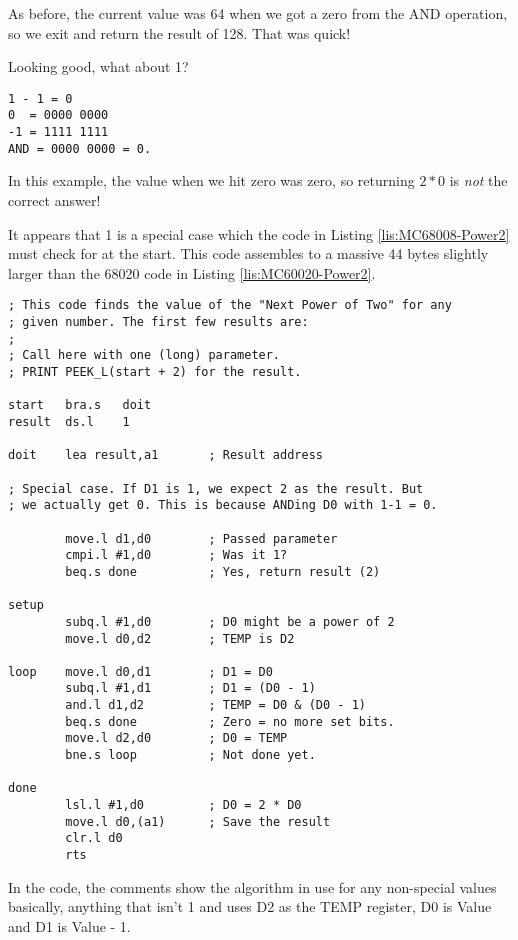 As before, the current value was 64 when we got a zero from the AND
operation, so we exit and return the result of 128. That was quick!

Looking good, what about 1?

\begin{lstlisting}[showstringspaces=false,tabsize=4,numbers=none]
1 - 1 = 0
0  = 0000 0000
-1 = 1111 1111
AND = 0000 0000 = 0.
\end{lstlisting}

In this example, the value when we hit zero was zero, so returning
$2*0$ is \emph{not} the correct answer!

It appears that 1 is a special case which the code in Listing \ref{lis:MC68008-Power2}
must check for at the start. This code assembles to a massive 44 bytes
\textendash{} slightly larger than the 68020 code in Listing \ref{lis:MC60020-Power2}.

\begin{lstlisting}[caption={MC68008 - Power2\_asm},label={lis:MC68008-Power2}]
; This code finds the value of the "Next Power of Two" for any
; given number. The first few results are:
;
; Call here with one (long) parameter.
; PRINT PEEK_L(start + 2) for the result.

start   bra.s   doit
result  ds.l    1

doit    lea result,a1       ; Result address

; Special case. If D1 is 1, we expect 2 as the result. But
; we actually get 0. This is because ANDing D0 with 1-1 = 0.

        move.l d1,d0        ; Passed parameter
        cmpi.l #1,d0        ; Was it 1?
        beq.s done          ; Yes, return result (2)

setup
        subq.l #1,d0        ; D0 might be a power of 2
        move.l d0,d2        ; TEMP is D2

loop    move.l d0,d1        ; D1 = D0
        subq.l #1,d1        ; D1 = (D0 - 1)
        and.l d1,d2         ; TEMP = D0 & (D0 - 1)
        beq.s done          ; Zero = no more set bits.
        move.l d2,d0        ; D0 = TEMP
        bne.s loop          ; Not done yet.

done
        lsl.l #1,d0         ; D0 = 2 * D0
        move.l d0,(a1)      ; Save the result
        clr.l d0
        rts

\end{lstlisting}

In the code, the comments show the algorithm in use for any non-special
values \textendash{} basically, anything that isn't 1 \textendash{}
and uses D2 as the TEMP register, D0 is Value and D1 is Value - 1.


